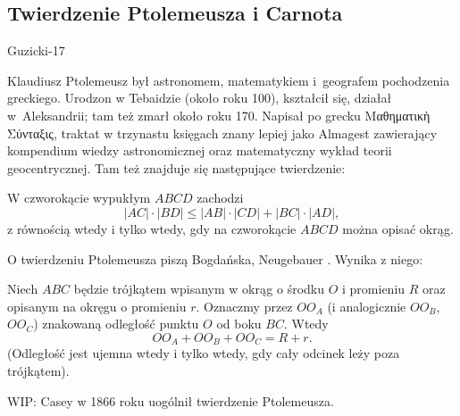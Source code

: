 \subsection{Twierdzenie Ptolemeusza i Carnota}
Guzicki-17

Klaudiusz Ptolemeusz był astronomem, matematykiem i~geografem pochodzenia greckiego.
Urodzon w Tebaidzie (około roku 100), kształcił się, działał w~Aleksandrii; tam też zmarł około roku 170.
Napisał po grecku Μαθηματικὴ Σύνταξις, traktat w trzynastu księgach znany lepiej jako Almagest zawierający kompendium wiedzy astronomicznej oraz matematyczny wykład teorii geocentrycznej.
Tam też znajduje się następujące twierdzenie:

\begin{theorem}[Ptolemeusza, 140]
    W czworokącie wypukłym $ABCD$ zachodzi
    \begin{equation}
        |AC| \cdot |BD| \le |AB| \cdot |CD| + |BC| \cdot |AD|,
    \end{equation}
    z równością wtedy i tylko wtedy, gdy na czworokącie $ABCD$ można opisać okrąg.
\end{theorem}

O twierdzeniu Ptolemeusza piszą Bogdańska, Neugebauer \cite[s. 62, 63]{neugebauer_2018}.
Wynika z niego:

\begin{theorem}[Carnot, 1???]
    Niech $ABC$ będzie trójkątem wpisanym w okrąg o środku $O$ i promieniu $R$ oraz opisanym na okręgu o promieniu $r$.
    Oznaczmy przez $OO_A$ (i analogicznie $OO_B$, $OO_C$) znakowaną odległość punktu $O$ od boku $BC$.
    Wtedy 
    \begin{equation}
        OO_A + OO_B + OO_C = R + r.
    \end{equation}
    (Odległość jest ujemna wtedy i tylko wtedy, gdy cały odcinek leży poza trójkątem).
\end{theorem}


\color{red}

WIP: Casey w 1866 roku uogólnił twierdzenie Ptolemeusza.

\color{black}

%